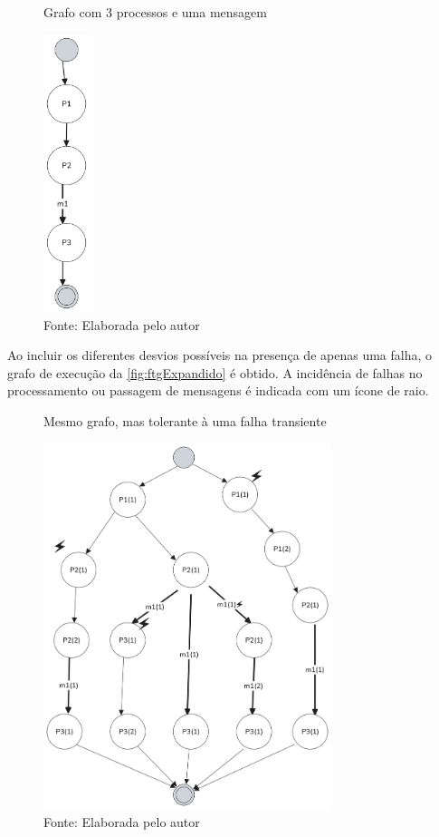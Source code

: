 \begin{figure}[H]
    \centering
	\captionsetup{justification=centering}
    \caption{Grafo com 3 processos e uma mensagem}
    \includegraphics[width=0.120\textwidth]{assets/ftg_simples.png}
	\captionsetup{justification=raggedright}
    \caption*{Fonte: Elaborada pelo autor}
    \label{fig:ftgSimples}
\end{figure}

Ao incluir os diferentes desvios possíveis na presença de apenas uma falha, o grafo de execução da \autoref{fig:ftgExpandido} é obtido. A incidência de falhas no processamento ou passagem de mensagens é indicada com um ícone de raio.

\begin{figure}[H]
    \centering
	\captionsetup{justification=centering}
    \caption{Mesmo grafo, mas tolerante à uma falha transiente}
    \includegraphics[width=0.75\textwidth]{assets/ftg_expandido.png}
	\captionsetup{justification=raggedright}
    \caption*{Fonte: Elaborada pelo autor}
    \label{fig:ftgExpandido}
\end{figure}

